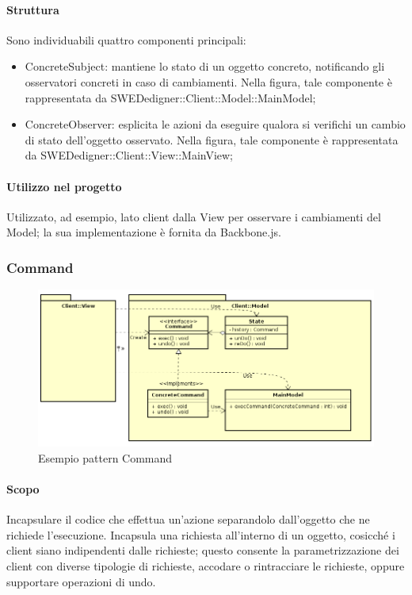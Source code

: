\documentclass[../PianoDiQualifica.tex]{subfiles}
\begin{document}
				\paragraph{Struttura\\}
					Sono individuabili quattro componenti principali:
					\begin{itemize}
						\item ConcreteSubject: mantiene lo stato di un oggetto concreto, notificando
						gli osservatori concreti in caso di cambiamenti. Nella figura, tale componente è rappresentata da SWEDedigner::Client::Model::MainModel;
						\item ConcreteObserver: esplicita le azioni da eseguire qualora si verifichi un cambio di stato
						dell'oggetto osservato. Nella figura, tale componente è rappresentata da SWEDedigner::Client::View::MainView;
					\end{itemize}
				\paragraph{Utilizzo nel progetto\\}
					Utilizzato, ad esempio, lato client dalla View per osservare i cambiamenti del
					Model; la sua implementazione è fornita da Backbone.js.
			\subsubsection{Command}
				\begin{figure}[H] \label{fig:Command}
					\centering
					\includegraphics[scale=0.8]{Immagini/CommandEx.png}
					\caption{Esempio pattern Command}
				\end{figure}
				\paragraph{Scopo\\}
					Incapsulare il codice che effettua un'azione separandolo dall'oggetto che ne
					richiede l'esecuzione. Incapsula una richiesta all’interno di un oggetto, cosicché i client siano indipendenti dalle richieste; questo consente la parametrizzazione dei client con diverse tipologie di richieste, accodare o rintracciare le richieste, oppure supportare operazioni di undo.
\end{document}
